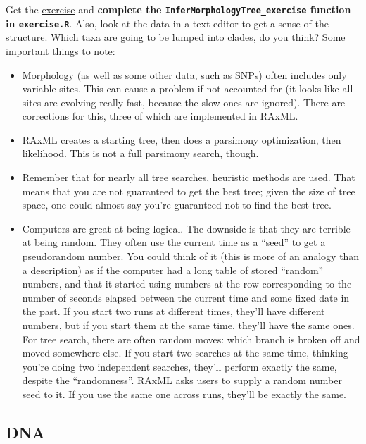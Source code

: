 \documentclass[
]{article}
\providecommand{\tightlist}{%
  \setlength{\itemsep}{0pt}\setlength{\parskip}{0pt}}
\begin{document}
Get the \href{https://github.com/PhyloMeth/LikelihoodTrees}{exercise} and \textbf{complete the \texttt{InferMorphologyTree\_exercise} function in \texttt{exercise.R}}. Also, look at the data in a text editor to get a sense of the structure. Which taxa are going to be lumped into clades, do you think? Some important things to note:

\begin{itemize}
\tightlist
\item
  Morphology (as well as some other data, such as SNPs) often includes only variable sites. This can cause a problem if not accounted for (it looks like all sites are evolving really fast, because the slow ones are ignored). There are corrections for this, three of which are implemented in RAxML.
\item
  RAxML creates a starting tree, then does a parsimony optimization, then likelihood. This is not a full parsimony search, though.
\item
  Remember that for nearly all tree searches, heuristic methods are used. That means that you are not guaranteed to get the best tree; given the size of tree space, one could almost say you're guaranteed not to find the best tree.
\item
  Computers are great at being logical. The downside is that they are terrible at being random. They often use the current time as a ``seed'' to get a pseudorandom number. You could think of it (this is more of an analogy than a description) as if the computer had a long table of stored ``random'' numbers, and that it started using numbers at the row corresponding to the number of seconds elapsed between the current time and some fixed date in the past. If you start two runs at different times, they'll have different numbers, but if you start them at the same time, they'll have the same ones. For tree search, there are often random moves: which branch is broken off and moved somewhere else. If you start two searches at the same time, thinking you're doing two independent searches, they'll perform exactly the same, despite the ``randomness''. RAxML asks users to supply a random number seed to it. If you use the same one across runs, they'll be exactly the same.
\end{itemize}

\hypertarget{dna}{%
\subsection{DNA}\label{dna}}
\end{document}
